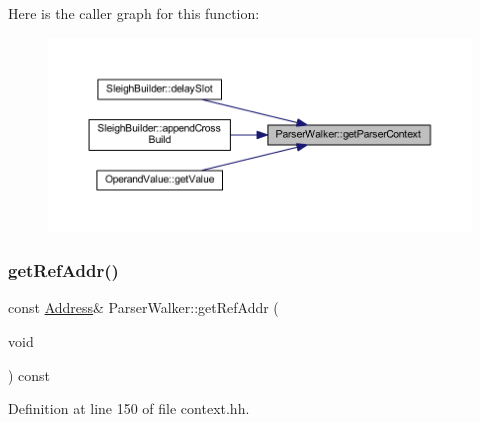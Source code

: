 Here is the caller graph for this function\+:
\nopagebreak
\begin{figure}[H]
\begin{center}
\leavevmode
\includegraphics[width=350pt]{class_parser_walker_a3468c4fffb0a6ab229883ac9769e46f2_icgraph}
\end{center}
\end{figure}
\mbox{\label{class_parser_walker_a0ddbb5961570e22d45fe72d33d86ffe6}} 
\subsubsection{\texorpdfstring{getRefAddr()}{getRefAddr()}}
{\footnotesize\ttfamily const \mbox{\hyperlink{class_address}{Address}}\& Parser\+Walker\+::get\+Ref\+Addr (\begin{DoxyParamCaption}\item[{void}]{ }\end{DoxyParamCaption}) const\hspace{0.3cm}{\ttfamily [inline]}}



Definition at line 150 of file context.\+hh.

